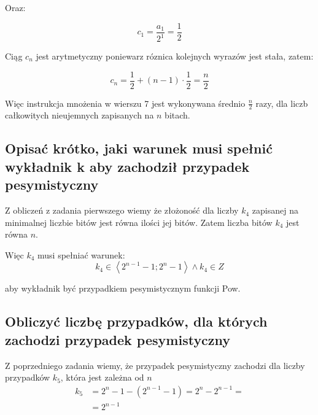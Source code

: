 \documentclass[a4paper,12pt]{article}
\begin{document}
Oraz:

\[ c_1 = \frac{a_1}{2^1} = \frac{1}{2} \]

Ciąg $c_n$ jest arytmetyczny poniewarz róznica kolejnych wyrazów jest stała, zatem:

\[ c_n = \frac{1}{2} + \left( n - 1 \right) \cdot \frac{1}{2} = \frac{n}{2} \]

Więc instrukcja mnożenia w wierszu 7 jest wykonywana średnio $\frac{n}{2}$ razy,
dla liczb całkowitych nieujemnych zapisanych na $n$ bitach.

\subsection{Opisać  krótko,  jaki  warunek  musi  spełnić  wykładnik k aby  zachodził  przypadek pesymistyczny}

Z obliczeń z zadania pierwszego wiemy że złożoność dla liczby $k_4$ zapisanej na minimalnej liczbie bitów jest
równa ilości jej bitów. Zatem liczba bitów $k_4$ jest równa $n$.

Więc $k_4$ musi spełniać warunek:
\[ k_4 \in \left\langle 2^{n-1} - 1; 2^n - 1 \right\rangle \wedge k_4 \in Z\]

aby wykładnik być przypadkiem pesymistycznym funkcji Pow.

\subsection{Obliczyć liczbę przypadków, dla których zachodzi przypadek pesymistyczny}

Z poprzedniego zadania wiemy, że przypadek pesymistyczny zachodzi dla liczby przypadków $k_5$,
która jest zależna od $n$
\begin{align*}
		k_5 &= 2^n - 1 - \left( 2^{n-1} - 1 \right) = 2^n - 2^{n- 1} = \\
		&= 2^{n-1}
\end{align*}
\end{document}
